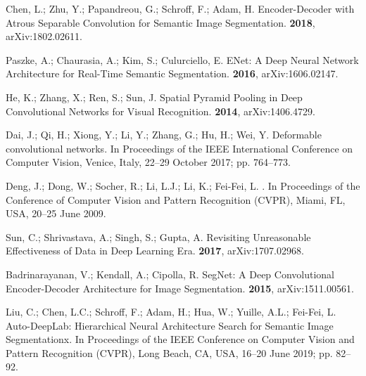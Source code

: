 \documentclass[sensors,article,accept,moreauthors,pdftex]{Definitions/mdpi}
\begin{document}
\begin{thebibliography}{999}
Chen, L.; Zhu, Y.; Papandreou, G.; Schroff, F.; Adam, H.
\newblock Encoder-Decoder with Atrous Separable Convolution for Semantic Image
Segmentation.
 {\bf 2018}, arXiv:1802.02611.

Paszke, A.; Chaurasia, A.; Kim, S.; Culurciello, E.
\newblock ENet: {A} Deep Neural Network Architecture for Real-Time Semantic
Segmentation.
 {\bf 2016}, arXiv:1606.02147.

He, K.; Zhang, X.; Ren, S.; Sun, J.
\newblock Spatial Pyramid Pooling in Deep Convolutional Networks for Visual
Recognition.
 {\bf 2014}, arXiv:1406.4729.

Dai, J.; Qi, H.; Xiong, Y.; Li, Y.; Zhang, G.; Hu, H.; Wei, Y. Deformable convolutional networks.
\newblock  In Proceedings of the IEEE International Conference on Computer Vision, Venice, Italy, 22--29 October 2017; pp. 764--773.  


Deng, J.; Dong, W.; Socher, R.; Li, L.J.; Li, K.; Fei-Fei, L.
.
\newblock  In Proceedings of the Conference of Computer Vision and Pattern Recognition (CVPR), Miami, FL, USA,  20--25 June  2009.

Sun, C.; Shrivastava, A.; Singh, S.; Gupta, A.
\newblock Revisiting Unreasonable Effectiveness of Data in Deep Learning Era.
 {\bf 2017}, arXiv:1707.02968.

Badrinarayanan, V.; Kendall, A.; Cipolla, R.
\newblock SegNet: {A} Deep Convolutional Encoder-Decoder Architecture for Image
Segmentation.
 {\bf 2015}, arXiv:1511.00561.

Liu, C.; Chen, L.C.; Schroff, F.; Adam, H.; Hua, W.; Yuille, A.L.; Fei-Fei, L.
\newblock Auto-DeepLab: Hierarchical Neural Architecture Search for Semantic
Image Segmentationx.
\newblock  In Proceedings of the  IEEE Conference on Computer Vision and Pattern Recognition
(CVPR), Long Beach, CA, USA, 16--20 June 2019; pp. 82--92. 


\end{thebibliography}
\end{document}
